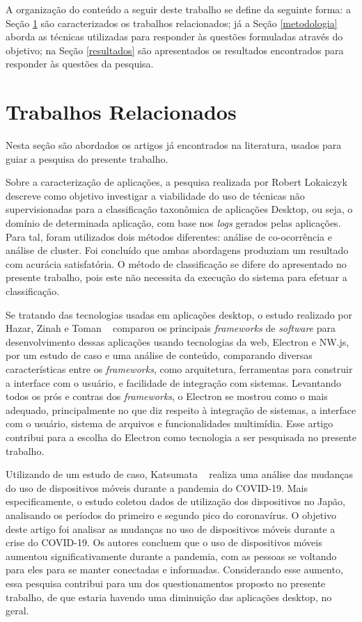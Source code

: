 \documentclass[12pt]{article}
\begin{document}
A organização do conteúdo a seguir deste trabalho se define da seguinte forma: a Seção \ref{trabalhosrelacionados} são caracterizados os trabalhos relacionados; já a Seção \ref{metodologia} aborda as técnicas utilizadas para responder às questões formuladas através do objetivo; na Seção \ref{resultados} são apresentados os resultados encontrados para responder às questões da pesquisa.

\section{Trabalhos Relacionados} \label{trabalhosrelacionados}

Nesta seção são abordados os artigos já encontrados na literatura, usados para guiar a pesquisa do presente trabalho.

Sobre a caracterização de aplicações, a pesquisa realizada por Robert Lokaiczyk ~\cite{4561878} descreve como objetivo investigar a viabilidade do uso de técnicas não supervisionadas para a classificação taxonômica de aplicações Desktop, ou seja, o domínio de determinada aplicação, com base nos \textit{logs} gerados pelas aplicações. Para tal, foram utilizados dois métodos diferentes: análise de co-ocorrência e análise de cluster. Foi concluído que ambas abordagens produziam um resultado com acurácia satisfatória. O método de classificação se difere do apresentado no presente trabalho, pois este não necessita da execução do sistema para efetuar a classificação.

Se tratando das tecnologias usadas em aplicações desktop, o estudo realizado por Hazar, Zinah e Toman ~\cite{toman2019depth} comparou os principais \textit{frameworks} de \textit{software} para desenvolvimento dessas aplicações usando tecnologias da web, Electron e NW.js, por um estudo de caso e uma análise de conteúdo, comparando diversas características entre os \textit{frameworks}, como arquitetura, ferramentas para construir a interface com o usuário, e facilidade de integração com sistemas. Levantando todos os prós e contras dos \textit{frameworks}, o Electron se mostrou como o mais adequado, principalmente no que diz respeito à integração de sistemas, a interface com o usuário, sistema de arquivos e funcionalidades multimídia. Esse artigo contribui para a escolha do Electron como tecnologia a ser pesquisada no presente trabalho.

Utilizando de um estudo de caso, Katsumata ~\cite{KATSUMATA2022100168} realiza uma análise das mudanças do uso de dispositivos móveis durante a pandemia do COVID-19. Mais especificamente, o estudo coletou dados de utilização dos dispositivos no Japão, analisando os períodos do primeiro e segundo pico do coronavírus. O objetivo deste artigo foi analisar as mudanças no uso de dispositivos móveis durante a crise do COVID-19. Os autores concluem que o uso de dispositivos móveis aumentou significativamente durante a pandemia, com as pessoas se voltando para eles para se manter conectadas e informadas. Considerando esse aumento, essa pesquisa contribui para um dos questionamentos proposto no presente trabalho, de que estaria havendo uma diminuição das aplicações desktop, no geral.
\end{document}

